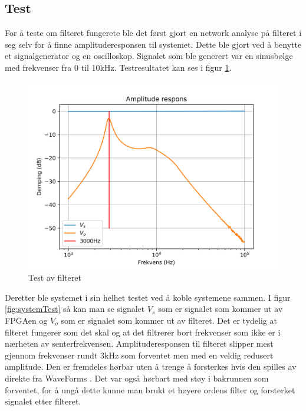 \subsection{Test}
\label{test}
For å teste om filteret fungerete ble det først gjort en network analyse på filteret i seg selv for å finne amplituderesponsen til systemet. Dette ble gjort ved å benytte et signalgenerator og en oscilloskop. Signalet som ble generert var en sinusbølge med frekvenser fra 0 til 10kHz. Testresultatet kan ses i figur \ref{fig:filterTest}.

\begin{figure} [!h]
\centering
\includegraphics[width=1\linewidth]{Bilder/Network2.png}
\caption{Test av filteret}
\label{fig:filterTest}
\end{figure}

Deretter ble systemet i sin helhet testet ved å koble systemene sammen. I figur \ref{fig:systemTest} så kan man se signalet $V_s$ som er signalet som kommer ut av FPGAen og $V_{o}$ som er signalet som kommer ut av filteret. Det er tydelig at filteret fungerer som det skal og at det filtrerer bort frekvenser som ikke er i nærheten av senterfrekvensen. Amplituderesponsen til filteret slipper mest gjennom frekvenser rundt 3kHz som forventet men med en veldig redusert amplitude. Den er fremdeles hørbar uten å trenge å forsterkes hvis den spilles av direkte fra WaveForms \cite[Digilent Inc.]{Ocili}. Det var også hørbart med støy i bakrunnen som forventet, for å ungå dette kunne man brukt et høyere ordens filter og forsterket signalet etter filteret.



